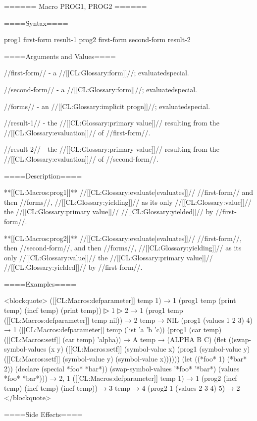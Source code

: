 ====== Macro PROG1, PROG2 ======

====Syntax====

\DefmacWithValues prog1 {first-form } {result-1} \DefmacWithValues prog2 {first-form second-form } {result-2}

====Arguments and Values====

//first-form// - a //[[CL:Glossary:form]]//; evaluatedspecial.

//second-form// - a //[[CL:Glossary:form]]//; evaluatedspecial.

//forms// - an //[[CL:Glossary:implicit progn]]//; evaluatedspecial.

//result-1// - the //[[CL:Glossary:primary value]]// resulting from the //[[CL:Glossary:evaluation]]// of //first-form//.

//result-2// - the //[[CL:Glossary:primary value]]// resulting from the //[[CL:Glossary:evaluation]]// of //second-form//.

====Description====

**[[CL:Macros:prog1]]** //[[CL:Glossary:evaluate|evaluates]]// //first-form// and then //forms//, //[[CL:Glossary:yielding]]// as its only //[[CL:Glossary:value]]// the //[[CL:Glossary:primary value]]// //[[CL:Glossary:yielded]]// by //first-form//.

**[[CL:Macros:prog2]]** //[[CL:Glossary:evaluate|evaluates]]// //first-form//, then //second-form//, and then //forms//, //[[CL:Glossary:yielding]]// as its only //[[CL:Glossary:value]]// the //[[CL:Glossary:primary value]]// //[[CL:Glossary:yielded]]// by //first-form//.

====Examples====

<blockquote> ([[CL:Macros:defparameter]] temp 1) → 1 (prog1 temp (print temp) (incf temp) (print temp))
▷ 1
▷ 2 → 1 (prog1 temp ([[CL:Macros:defparameter]] temp nil)) → 2 temp → NIL (prog1 (values 1 2 3) 4) → 1 ([[CL:Macros:defparameter]] temp (list 'a 'b 'c)) (prog1 (car temp) ([[CL:Macros:setf]] (car temp) 'alpha)) → A temp → (ALPHA B C) (flet ((swap-symbol-values (x y) ([[CL:Macros:setf]] (symbol-value x) (prog1 (symbol-value y) ([[CL:Macros:setf]] (symbol-value y) (symbol-value x)))))) (let ((*foo* 1) (*bar* 2)) (declare (special *foo* *bar*)) (swap-symbol-values '*foo* '*bar*) (values *foo* *bar*))) → 2, 1 ([[CL:Macros:defparameter]] temp 1) → 1 (prog2 (incf temp) (incf temp) (incf temp)) → 3 temp → 4 (prog2 1 (values 2 3 4) 5) → 2 </blockquote>

====Side Effects====

